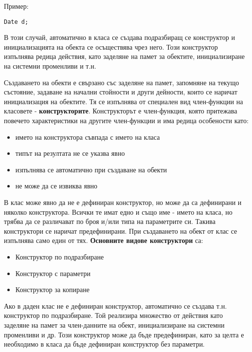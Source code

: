 \documentclass{article}
\begin{document}
Пример: \begin{lstlisting}
Date d;
\end{lstlisting}
В този случай, автоматично в класа се създава
подразбиращ се конструктор и инициализацията на обекта се осъществява чрез него. Този конструктор изпълнява редица действия,
като заделяне на памет за обектите, инициализиране на системни променливи и т.н.

Създаването на обекти е свързано със заделяне на памет, запомняне на текущо състояние, задаване на начални стойности и други
дейности, които се наричат инициализация на обектите. Тя се изпълнява от специален вид член-функции на класовете -
\textbf{конструкторите}. Конструкторът е член-функция, която притежава повечето характеристики на другите член-функции и има
редица особености като:
\begin{itemize}
    \item името на конструктора съвпада с името на класа
    \item типът на резултата не се указва явно
    \item изпълнява се автоматично при създаване на обекти
    \item не може да се извиква явно
\end{itemize}
В клас може явно да не е дефиниран конструктор, но може да са дефинирани и няколко конструктора. Всички те имат едно и също име - 
името на класа, но трябва да се различават по броя и/или типа на параметрите си. Такива конструктори се наричат предефинирани.
При създаването на обект от клас се изпълнява само един от тях. \textbf{Основните видове конструктори} са:
\begin{itemize}
    \item Конструктор по подразбиране
    \item Конструктор с параметри
    \item Конструктор за копиране
\end{itemize}
Ако в даден клас не е дефиниран конструктор, автоматично се създава т.н. конструктор по подразбиране. Той реализира множество от
действия като заделяне на памет за член-данните на обект, инициализиране на системни променливи и др. Този конструктор може да
бъде предефиниран, като за целта е необходимо в класа да бъде дефиниран конструктор без параметри.
\end{document}
